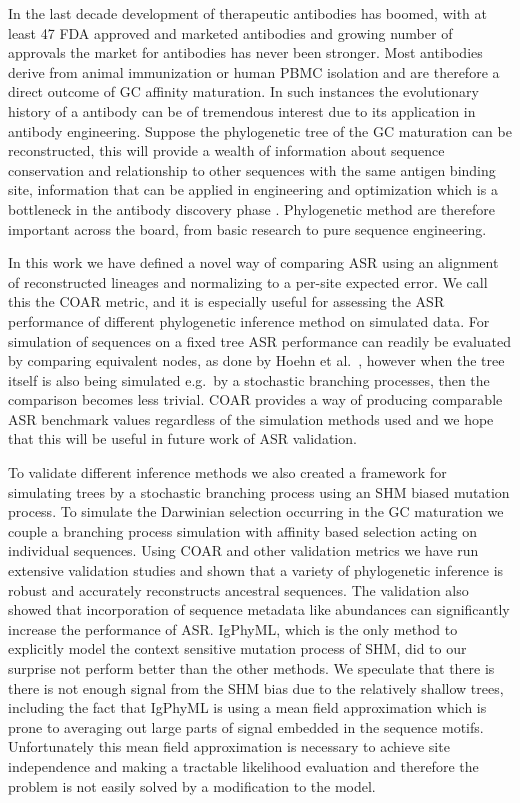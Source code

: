 In the last decade development of therapeutic antibodies has boomed, with at least 47 FDA approved and marketed antibodies and growing number of approvals \cite{ecker2015therapeutic} the market for antibodies has never been stronger.
Most antibodies derive from animal immunization or human PBMC isolation \cite{reichert2012marketed} and are therefore a direct outcome of GC affinity maturation.
In such instances the evolutionary history of a antibody can be of tremendous interest due to its application in antibody engineering.
Suppose the phylogenetic tree of the GC maturation can be reconstructed, this will provide a wealth of information about sequence conservation and relationship to other sequences with the same antigen binding site, information that can be applied in engineering and optimization which is a bottleneck in the antibody discovery phase \cite{dubel2014handbook}.
Phylogenetic method are therefore important across the board, from basic research to pure sequence engineering.

In this work we have defined a novel way of comparing ASR using an alignment of reconstructed lineages and normalizing to a per-site expected error.
We call this the COAR metric, and it is especially useful for assessing the ASR performance of different phylogenetic inference method on simulated data.
For simulation of sequences on a fixed tree ASR performance can readily be evaluated by comparing equivalent nodes, as done by Hoehn et al.\ \cite{Hoehn2016-wg}, however when the tree itself is also being simulated e.g.\ by a stochastic branching processes, then the comparison becomes less trivial.
COAR provides a way of producing comparable ASR benchmark values regardless of the simulation methods used and we hope that this will be useful in future work of ASR validation.

To validate different inference methods we also created a framework for simulating trees by a stochastic branching process using an SHM biased mutation process.
To simulate the Darwinian selection occurring in the GC maturation we couple a branching process simulation with affinity based selection acting on individual sequences.
Using COAR and other validation metrics we have run extensive validation studies and shown that a variety of phylogenetic inference is robust and accurately reconstructs ancestral sequences.
The validation also showed that incorporation of sequence metadata like abundances can significantly increase the performance of ASR.
IgPhyML, which is the only method to explicitly model the context sensitive mutation process of SHM, did to our surprise not perform better than the other methods.
We speculate that there is there is not enough signal from the SHM bias due to the relatively shallow trees, including the fact that IgPhyML is using a mean field approximation which is prone to averaging out large parts of signal embedded in the sequence motifs.
Unfortunately this mean field approximation is necessary to achieve site independence and making a tractable likelihood evaluation and therefore the problem is not easily solved by a modification to the model.

